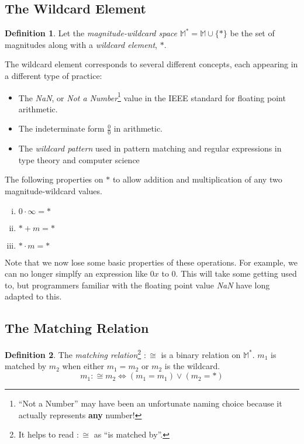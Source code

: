 \documentclass[twoside]{article}
\newcommand{\quotes}[1]{``#1''}
\theoremstyle{plain}%
\theoremstyle{definition}
\newtheorem{definition}{Definition}[section]
\theoremstyle{remark}
\begin{document}
\subsection{The Wildcard Element}

\begin{definition}
Let the \textit{magnitude-wildcard space} \(\mathbb{M}^*= \mathbb{M} \cup \{\ast\}\) be the set of magnitudes along with a \textit{wildcard element}, \(\ast\).
\end{definition}

The wildcard element corresponds to several different concepts, each appearing in a different type of practice:
\begin{itemize}
  \item The \textit{NaN}, or \textit{Not a Number}\footnote{\quotes{Not a Number} may have been an unfortunate naming choice because it actually represents \textbf{any} number!} value in the IEEE standard for floating point arithmetic\cite{ieee}.
  \item The indeterminate form \(\frac{0}{0}\) in arithmetic.
  \item The \textit{wildcard pattern} used in pattern matching and regular expressions in type theory and computer science
\end{itemize}

The following properties on \(\ast\) to allow addition and multiplication of any two magnitude-wildcard values.
\begin{enumerate}[(i)]
  \item \(0 \cdot \infty = \ast\)
  \item \(\ast + m = \ast\)
  \item \(\ast \cdot m = \ast\)
\end{enumerate}

Note that we now lose some basic properties of these operations. For example, we can no longer simplfy an expression like \(0x\) to \(0\). This will take some getting used to, but programmers familiar with the floating point value \textit{NaN} have long adapted to this.

\subsection{The Matching Relation}

\begin{definition}
The \textit{matching relation}\footnote{It helps to read \(:\cong\) as \quotes{is matched by}.} \(:\cong\) is a binary relation on \(\mathbb{M}^*\). \(m_1\) is matched by \(m_2\) when either \(m_1 = m_2\) or  \(m_2\) is the wildcard.
\[m_1 :\cong m_2 \Longleftrightarrow (m_1 = m_1) \vee (m_2 = \ast)\]
\end{definition}
\end{document}
